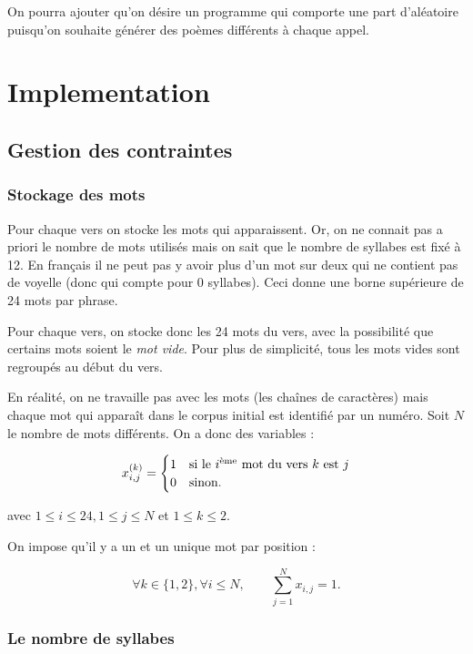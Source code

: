 \documentclass[a4paper,11pt]{article}
\begin{document}
On pourra ajouter qu'on désire un programme qui comporte une part d'aléatoire puisqu'on souhaite générer des poèmes différents à chaque appel.

\section{Implementation}

\subsection{Gestion des contraintes}

\subsubsection{Stockage des mots}

Pour chaque vers on stocke les mots qui apparaissent. Or, on ne connait pas a priori le nombre de mots utilisés mais on sait que le nombre de syllabes est fixé à 12. En français il ne peut pas y avoir plus d'un mot sur deux qui ne contient pas de voyelle (donc qui compte pour 0 syllabes). Ceci donne une borne supérieure de 24 mots par phrase.

Pour chaque vers, on stocke donc les 24 mots du vers, avec la possibilité que certains mots soient le \textit{mot vide}. Pour plus de simplicité, tous les mots vides sont regroupés au début du vers.

En réalité, on ne travaille pas avec les mots (les chaînes de caractères) mais chaque mot qui apparaît dans le corpus initial est identifié par un numéro. Soit $N$ le nombre de mots différents. On a donc des variables :

\[x_{i,j}^{(k)} =
\begin{cases} 
1 & \mbox{si le } i \mbox{\textsuperscript{ème} mot du vers } k \mbox{ est } j \\ 
0 & \mbox{sinon.} 
\end{cases}
 \]

avec $1 \leq i \leq 24, 1 \leq j \leq N$ et $1 \leq k \leq 2$.

On impose qu'il y a un et un unique mot par position :

\[\forall k \in \{1,2\}, \forall i \leq N, \qquad \sum_{j=1}^{N} x_{i,j} = 1.\]

\subsubsection{Le nombre de syllabes}
\end{document}
